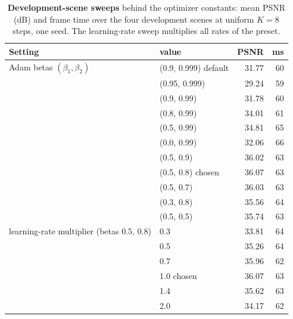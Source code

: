\begin{table}[t]
\centering
\footnotesize\setlength{\tabcolsep}{4pt}
\begin{tabular}{llrr}
\toprule
\textbf{Setting} & \textbf{value} & PSNR & ms \\
\midrule
Adam betas $(\beta_1,\beta_2)$ & (0.9, 0.999) default & 31.77 & 60 \\
 & (0.95, 0.999) & 29.24 & 59 \\
 & (0.9, 0.99) & 31.78 & 60 \\
 & (0.8, 0.99) & 34.01 & 61 \\
 & (0.5, 0.99) & 34.81 & 65 \\
 & (0.0, 0.99) & 32.06 & 66 \\
 & (0.5, 0.9) & 36.02 & 63 \\
 & (0.5, 0.8) chosen & 36.07 & 63 \\
 & (0.5, 0.7) & 36.03 & 63 \\
 & (0.3, 0.8) & 35.56 & 64 \\
 & (0.5, 0.5) & 35.74 & 63 \\
\midrule
learning-rate multiplier (betas 0.5, 0.8) & 0.3 & 33.81 & 64 \\
 & 0.5 & 35.26 & 64 \\
 & 0.7 & 35.96 & 62 \\
 & 1.0 chosen & 36.07 & 63 \\
 & 1.4 & 35.62 & 63 \\
 & 2.0 & 34.17 & 62 \\
\bottomrule
\end{tabular}
\caption{\textbf{Development-scene sweeps} behind the optimizer constants: mean PSNR (dB) and frame time over the four development scenes at uniform $K{=}8$ steps, one seed. The learning-rate sweep multiplies all rates of the preset.}
\label{tab:enginedev}
\end{table}
